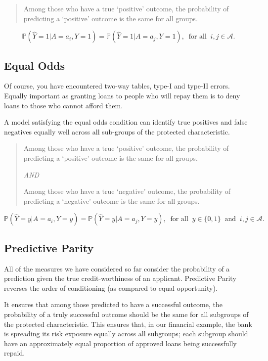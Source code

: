 \documentclass[
  letterpaper,
  DIV=11,
  numbers=noendperiod]{scrreprt}
\begin{document}
\begin{quote}
Among those who have a true `positive' outcome, the probability of
predicting a `positive' outcome is the same for all groups.
\end{quote}

\[\mathbb{P}(\hat Y = 1 | A = a_i, Y =1) = \mathbb{P}( \hat Y = 1 | A = a_j, Y=1), \  \text{ for all }\  i,j \in \mathcal{A}.\]

\subsection{Equal Odds}\label{equal-odds}

Of course, you have encountered two-way tables, type-I and type-II
errors. Equally important as granting loans to people who will repay
them is to deny loans to those who cannot afford them.

A model satisfying the equal odds condition can identify true positives
and false negatives equally well across all sub-groups of the protected
characteristic.

\begin{quote}
Among those who have a true `positive' outcome, the probability of
predicting a `positive' outcome is the same for all groups.

\emph{AND}

Among those who have a true `negative' outcome, the probability of
predicting a `negative' outcome is the same for all groups.
\end{quote}

\[\mathbb{P}(\hat Y = y | A = a_i, Y =y) = \mathbb{P}( \hat Y = y | A = a_j, Y=y), \ \text{ for all } \ y \in \{0,1\} \ \text{ and } \  i,j \in \mathcal{A}.\]

\subsection{Predictive Parity}\label{predictive-parity}

All of the measures we have considered so far consider the probability
of a prediction given the true credit-worthiness of an applicant.
Predictive Parity reverses the order of conditioning (as compared to
equal opportunity).

It ensures that among those predicted to have a successful outcome, the
probability of a truly successful outcome should be the same for all
subgroups of the protected characteristic. This ensures that, in our
financial example, the bank is spreading its risk exposure equally
across all subgroups; each subgroup should have an approximately equal
proportion of approved loans being successfully repaid.
\end{document}
